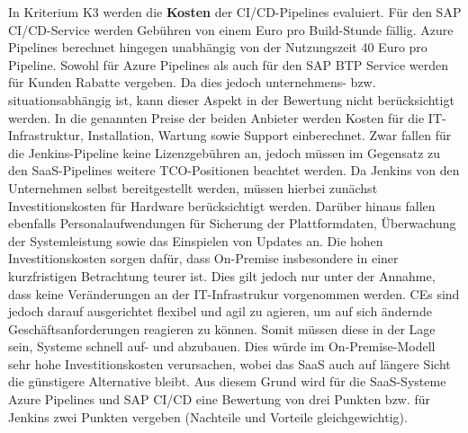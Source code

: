In Kriterium K3 werden die \textbf{Kosten} der CI/CD-Pipelines evaluiert. Für den SAP CI/CD-Service werden Gebühren von einem Euro pro Build-Stunde fällig. Azure Pipelines berechnet hingegen unabhängig von der Nutzungszeit 40 Euro pro Pipeline. Sowohl für Azure Pipelines als auch für den SAP BTP Service werden für Kunden Rabatte vergeben. Da dies jedoch unternehmens- bzw. situationsabhängig ist, kann dieser Aspekt in der Bewertung nicht berücksichtigt werden. In die genannten Preise der beiden Anbieter werden Kosten für die IT-Infrastruktur, Installation, Wartung sowie Support einberechnet. Zwar fallen für die Jenkins-Pipeline keine Lizenzgebühren an, jedoch müssen im Gegensatz zu den SaaS-Pipelines weitere TCO-Positionen beachtet werden. Da Jenkins von den Unternehmen selbst bereitgestellt werden, müssen hierbei zunächst Investitionskosten für Hardware berücksichtigt werden. Darüber hinaus fallen ebenfalls Personalaufwendungen für Sicherung der Plattformdaten, Überwachung der Systemleistung sowie das Einspielen von Updates an. Die hohen Investitionskosten sorgen dafür, dass On-Premise insbesondere in einer kurzfristigen Betrachtung teurer ist. Dies gilt jedoch nur unter der Annahme, dass keine Veränderungen an der IT-Infrastrukur vorgenommen werden. CEs sind jedoch darauf ausgerichtet flexibel und agil zu agieren, um auf sich ändernde Geschäftsanforderungen reagieren zu können. Somit müssen diese in der Lage sein, Systeme schnell auf- und abzubauen. Dies würde im On-Premise-Modell sehr hohe Investitionskosten verursachen, wobei das SaaS auch auf längere Sicht die günstigere Alternative bleibt. Aus diesem Grund wird für die SaaS-Systeme Azure Pipelines und SAP CI/CD eine Bewertung von drei Punkten bzw. für Jenkins zwei Punkten vergeben (Nachteile und Vorteile gleichgewichtig).\\

